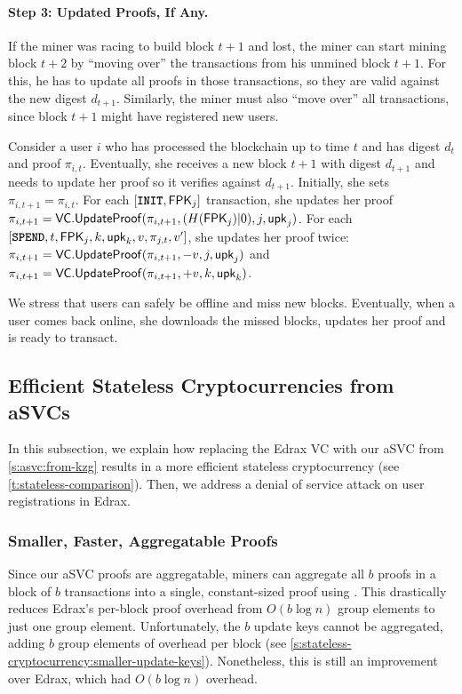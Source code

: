 \paragraph{Step 3: Updated Proofs, If Any.}
If the miner was racing to build block $t+1$ and lost, the miner can start mining block $t+2$ by ``moving over'' the \spendtxn transactions from his unmined block $t+1$.
For this, he has to update all proofs in those \spendtxn transactions, so they are valid against the new digest $d_{t+1}$.
Similarly, the miner must also ``move over'' all \inittxn transactions, since block $t+1$ might have registered new users.

Consider a user $i$ who has processed the blockchain up to time $t$ and has digest $d_t$ and proof $\pi_{i,t}$.
Eventually, she receives a new block $t+1$ with digest $d_{t+1}$ and needs to update her proof so it verifies against $d_{t+1}$.
Initially, she sets $\pi_{i,t+1} = \pi_{i,t}$.
For each $[\texttt{\textbf{INIT}},\mathbf{\mathsf{FPK}}_j]$ transaction, she updates her proof $\pi_{i,t+1} = \mathsf{VC}.\mathsf{UpdateProof}(\pi_{i,t+1}, (H(\mathbf{\mathsf{FPK}}_j)|0), j, \mathsf{upk}_j)$.
For each $[\texttt{\textbf{SPEND}}, t, \mathbf{\mathsf{FPK}}_j, k, \mathsf{upk}_k, v,\pi_{j,t}, v']$, she updates her proof twice: $\pi_{i,t+1} =\mathsf{VC}.\mathsf{UpdateProof}(\pi_{i,t+1}, -v, j, \mathsf{upk}_j)$ and $\pi_{i,t+1} =\mathsf{VC}.\mathsf{UpdateProof}(\pi_{i,t+1}, +v, k, \mathsf{upk}_k)$.

We stress that users can safely be offline and miss new blocks.
Eventually, when a user comes back online, she downloads the missed blocks, updates her proof and is ready to transact.

\subsection{Efficient Stateless Cryptocurrencies from aSVCs}
In this subsection, we explain how replacing the Edrax VC with our aSVC from \cref{s:asvc:from-kzg} results in a more efficient stateless cryptocurrency (see \cref{t:stateless-comparison}).
Then, we address a denial of service attack on user registrations in Edrax.

\subsubsection{Smaller, Faster, Aggregatable Proofs}
Since our aSVC proofs are aggregatable, miners can aggregate all $b$ proofs in a block of $b$ transactions into a single, constant-sized proof using \vcaggregateproofs.
This drastically reduces Edrax's per-block proof overhead from $O(b\log{n})$ group elements to just one group element.
Unfortunately, the $b$ update keys cannot be aggregated, adding $b$ group elements of overhead per block (see \cref{s:stateless-cryptocurrency:smaller-update-keys}).
Nonetheless, this is still an improvement over Edrax, which had $O(b\log{n})$ overhead.

